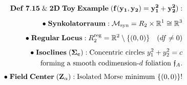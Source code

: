 \documentclass[preview]{standalone}
\begin{document}
\begin{align*}
\special{dvisvgm:raw <g id='unique000'>}\mathbf{Def\;7.15\;\&\;2D\;Toy\;Example\;(f(y_1,y_2)=y_1^2+y_2^2):}\\[5pt]\bullet\;\mathbf{Synkolatorraum:}\;\mathcal{M}_{\text{syn}} = R_2\times\mathbb{R}^1 \cong \mathbb{R}^3\\[4pt]\bullet\;\mathbf{Regular\;Locus:}\;R_2^{\text{reg}} = \mathbb{R}^2\setminus\{(0,0)\}\quad(df\neq 0)\\[4pt]\bullet\;\mathbf{Isoclines\;(\Sigma_c):}\;\text{Concentric circles }y_1^2+y_2^2=c\\\;\;\text{forming a smooth codimension-}d\text{ foliation }\mathfrak{f}_A.\\[4pt]\bullet\;\mathbf{Field\;Center\;(Z_\alpha):}\;\text{Isolated Morse minimum }\{(0,0)\}!\special{dvisvgm:raw </g>}
\end{align*}
\end{document}
